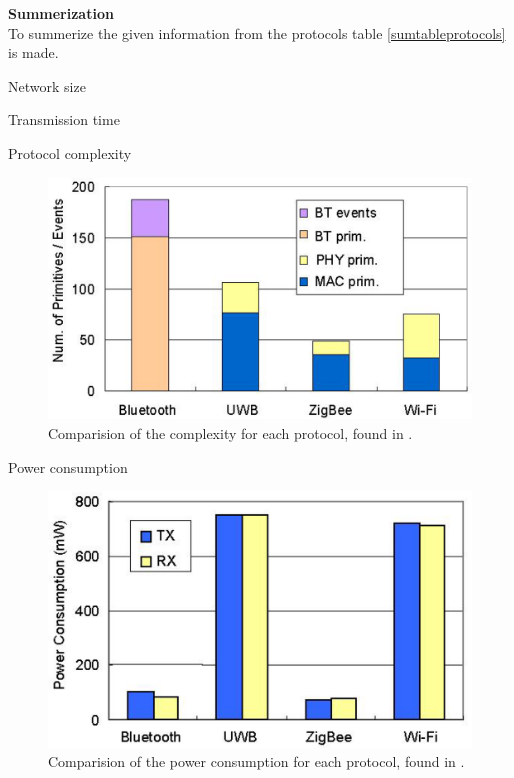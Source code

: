 \documentclass[10pt,a4paper]{article}
\begin{document}
\textbf{Summerization}\\
To summerize the given information from the protocols table \ref{sumtableprotocols} is made.

Network size

Transmission time

Protocol complexity
\begin{figure}[H]
   \centering
   \includegraphics[width=1\textwidth]{protocolcomplexity}
   \caption{Comparision of the complexity for each protocol, found in \cite{comparitivestudywirelessprotocols}.}
   \label{fig:protocolcomplexity}
\end{figure}




Power consumption
\begin{figure}[H]
   \centering
   \includegraphics[width=1\textwidth]{images/protocolenergy.png}
   \caption{Comparision of the power consumption for each protocol, found in \cite{comparitivestudywirelessprotocols}.}
   \label{fig:protocolenergy}
\end{figure}
\end{document}
